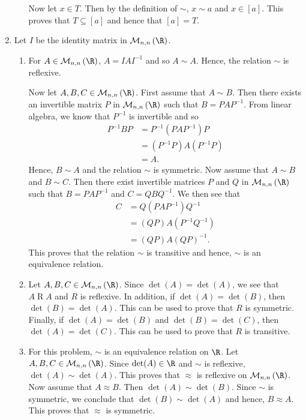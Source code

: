 \begin{enumerate}
\begin{enumerate}
Now let  $x \in T$.  Then by the definition of  $\sim$,  $x \sim a$ and  
$x \in \left[ a \right]$.  This proves that  $T \subseteq \left[ a \right]$ and hence that  
$\left[ a \right] = T$.
\end{enumerate}



\item Let $I$ be the identity matrix in $\mathcal{M}_{n, n}\left( \R \right)$.
\begin{enumerate}
\item For $A \in \mathcal{M}_{n, n}\left( \R \right)$, $A = IAI^{-1}$ and so $A \sim A$.  Hence, the relation $\sim$ is reflexive.  

Now let $A, B, C \in \mathcal{M}_{n, n}\left( \R \right)$.  First assume that $A \sim B$.  Then there exists an invertible matrix $P$ in $\mathcal{M}_{n, n}\left( \R \right)$ such that $B = PAP^{-1}$.  From linear algebra, we know that $P^{-1}$ is invertible and so
\begin{align*}
P^{-1}BP &= P^{-1} \left( PAP^{-1} \right) P \\
         &= \left( P^{-1}P \right) A \left( P^{-1} P \right) \\
         &= A.
\end{align*}
Hence, $B \sim A$ and the relation $\sim$ is symmetric.  Now assume that $A \sim B$ and 
$B \sim C$.  Then there exist invertible matrices $P$ and $Q$ in 
$\mathcal{M}_{n, n}\left( \R \right)$ such that $B = PAP^{-1}$ and $C = QBQ^{-1}$.  We then see that
\begin{align*}
C &= Q \left( PAP^{-1} \right) Q^{-1} \\
  &= \left(QP \right) A \left( P^{-1} Q^{-1} \right) \\
  &= \left( QP \right) A \left( QP \right)^{-1}.
\end{align*}
This proves that the relation $\sim$ is transitive and hence, $\sim$ is an equivalence relation.

\item Let $A, B, C \in \mathcal{M}_{n, n}\left( \R \right)$.  Since $\det(A) = \det(A)$, we see that $A \mathrel{R} A$ and $R$ is reflexive.  In addition, if $\det(A) = \det(B)$, then $\det(B) = \det(A)$.  This can be used to prove that $R$ is symmetric.  Finally, if 
$\det(A) = \det(B)$ and $\det(B) = \det(C)$, then $\det(A) = \det(C)$.  This can be used to prove that $R$ is transitive.

\item For this problem, $\sim$ is an equivalence relation on $\R$. Let $A, B, C \in \mathcal{M}_{n, n}\left( \R \right)$.  Since $\det(A) \in \R$ and $\sim$ is reflexive, 
$\det(A) \sim \det(A)$.  This proves that $\approx$ is reflexive on 
$\mathcal{M}_{n, n}\left( \R \right)$.  Now assume that $A \approx B$.  Then $\det(A) \sim \det(B)$.  Since $\sim$ is symmetric, we conclude that $\det(B) \sim \det(A)$ and hence, 
$B \approx A$.  This proves that $\approx$ is symmetric.


\end{enumerate}
\end{enumerate}
